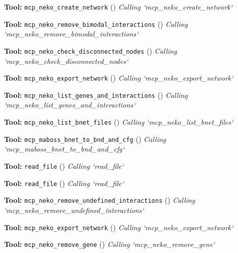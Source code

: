 \documentclass[11pt,a4paper]{article}
\begin{document}
\begin{toolokbox}
\textbf{Tool:} \texttt{mcp\_neko\_create\_network} (\checkmark)
\textit{Calling `mcp\_neko\_create\_network`}
\end{toolokbox}
\begin{toolokbox}
\textbf{Tool:} \texttt{mcp\_neko\_remove\_bimodal\_interactions} (\checkmark)
\textit{Calling `mcp\_neko\_remove\_bimodal\_interactions`}
\end{toolokbox}
\begin{toolokbox}
\textbf{Tool:} \texttt{mcp\_neko\_check\_disconnected\_nodes} (\checkmark)
\textit{Calling `mcp\_neko\_check\_disconnected\_nodes`}
\end{toolokbox}
\begin{toolokbox}
\textbf{Tool:} \texttt{mcp\_neko\_export\_network} (\checkmark)
\textit{Calling `mcp\_neko\_export\_network`}
\end{toolokbox}
\begin{toolokbox}
\textbf{Tool:} \texttt{mcp\_neko\_list\_genes\_and\_interactions} (\checkmark)
\textit{Calling `mcp\_neko\_list\_genes\_and\_interactions`}
\end{toolokbox}
\begin{toolokbox}
\textbf{Tool:} \texttt{mcp\_neko\_list\_bnet\_files} (\checkmark)
\textit{Calling `mcp\_neko\_list\_bnet\_files`}
\end{toolokbox}
\begin{toolokbox}
\textbf{Tool:} \texttt{mcp\_maboss\_bnet\_to\_bnd\_and\_cfg} (\checkmark)
\textit{Calling `mcp\_maboss\_bnet\_to\_bnd\_and\_cfg`}
\end{toolokbox}
\begin{toolokbox}
\textbf{Tool:} \texttt{read\_file} (\checkmark)
\textit{Calling `read\_file`}
\end{toolokbox}
\begin{toolokbox}
\textbf{Tool:} \texttt{read\_file} (\checkmark)
\textit{Calling `read\_file`}
\end{toolokbox}
\begin{toolokbox}
\textbf{Tool:} \texttt{mcp\_neko\_remove\_undefined\_interactions} (\checkmark)
\textit{Calling `mcp\_neko\_remove\_undefined\_interactions`}
\end{toolokbox}
\begin{toolokbox}
\textbf{Tool:} \texttt{mcp\_neko\_export\_network} (\checkmark)
\textit{Calling `mcp\_neko\_export\_network`}
\end{toolokbox}
\begin{toolokbox}
\textbf{Tool:} \texttt{mcp\_neko\_remove\_gene} (\checkmark)
\textit{Calling `mcp\_neko\_remove\_gene`}
\end{toolokbox}
\end{document}
